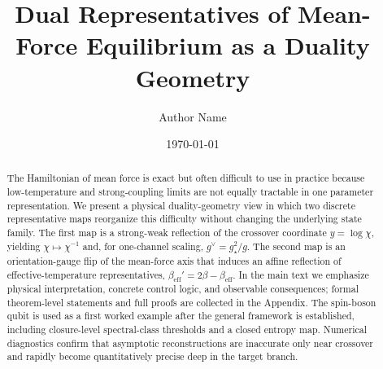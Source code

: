 \documentclass[aps,prl,twocolumn,superscriptaddress,floatfix]{revtex4-2}
\theoremstyle{definition}
\theoremstyle{remark}
\newcommand{\beff}{\beta_{\mathrm{eff}}}
\begin{document}
\title{Dual Representatives of Mean-Force Equilibrium as a Duality Geometry}
\author{Author Name}
\date{\today}

\begin{abstract}
The Hamiltonian of mean force is exact but often difficult to use in practice because low-temperature
and strong-coupling limits are not equally tractable in one parameter representation.
We present a physical duality-geometry view in which two discrete representative maps reorganize this
difficulty without changing the underlying state family.
The first map is a strong-weak reflection of the crossover coordinate \(y=\log\chi\), yielding
\(\chi\mapsto\chi^{-1}\) and, for one-channel scaling, \(g^\vee=g_\star^2/g\).
The second map is an orientation-gauge flip of the mean-force axis that induces an affine reflection
of effective-temperature representatives, \(\beff'=2\beta-\beff\).
In the main text we emphasize physical interpretation, concrete control logic, and observable
consequences; formal theorem-level statements and full proofs are collected in the Appendix.
The spin-boson qubit is used as a first worked example after the general framework is established,
including closure-level spectral-class thresholds and a closed entropy map.
Numerical diagnostics confirm that asymptotic reconstructions are inaccurate only near crossover and
rapidly become quantitatively precise deep in the target branch.
\end{abstract}

\maketitle











\appendix



\end{document}
